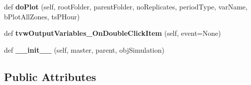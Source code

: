\begin{DoxyCompactItemize}
def {\bfseries do\+Plot} (self, root\+Folder, parent\+Folder, no\+Replicates, period\+Type, var\+Name, b\+Plot\+All\+Zones, ts\+P\+Hour)
\item 
\mbox{\label{class_f_plots_1_1_frm_plots_a9dcb77423e5f2f8ca4e2941947a418c9}} 
def {\bfseries tvw\+Output\+Variables\+\_\+\+On\+Double\+Click\+Item} (self, event=None)
\item 
\mbox{\label{class_f_plots_1_1_frm_plots_a9122a2b5fbc4bca093af108dab691906}} 
def {\bfseries \+\_\+\+\_\+init\+\_\+\+\_\+} (self, master, parent, obj\+Simulation)
\end{DoxyCompactItemize}
\subsection*{Public Attributes}
